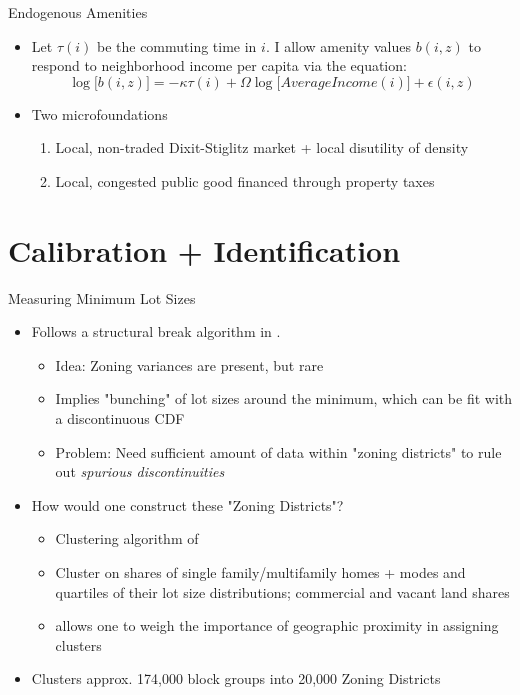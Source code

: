 \documentclass{beamer}
\begin{document}
\begin{frame}{Endogenous Amenities}
	\begin{itemize}
		\color{black}
		\itemsep1em
		\item  Let $\tau(i)$ be the commuting time in $i$. I allow amenity values $b(i, z)$ to respond to neighborhood income per capita via the equation:
		\begin{equation}
			\log\big[b(i, z)\big] = -\kappa\tau(i) + \Omega\log\bigg[AverageIncome(i)\bigg] + \epsilon(i, z)
		\end{equation} \pause
		\item Two microfoundations 
		\begin{enumerate}
			\itemsep1em
			\item Local, non-traded Dixit-Stiglitz market  \citep{Coutureetal} \citep{AlmagroDI} + local disutility of density \citep{KSC} \pause
			\item Local, congested public good financed through property taxes \citep{calabresetal} \citep{ineffTiebout}
		\end{enumerate}
	\end{itemize}
\end{frame}

\section{Calibration + Identification}

\begin{frame}{Measuring Minimum Lot Sizes}\label{returnZoningDist}
	\begin{itemize}
		\color{black}
		\itemsep1em
		\item Follows a structural break algorithm in \cite{Song}.
		\begin{itemize}
			\item Idea: Zoning variances are present, but rare 
			\item Implies "bunching" of lot sizes around the minimum, which can be fit with a discontinuous CDF  \pause 
			\item Problem: Need sufficient amount of data within "zoning districts" to rule out \textit{spurious discontinuities}
			
		\end{itemize} \pause
		
		\item How would one construct these "Zoning Districts"?
		\begin{itemize}
			\item Clustering algorithm of \cite{Chavent2018}
			\item Cluster on shares of single family/multifamily homes + modes and quartiles of their lot size distributions; commercial and vacant land shares
			\item allows one to weigh the importance of geographic proximity in assigning clusters
		\end{itemize}
	\item Clusters approx. 174,000 block groups into 20,000 Zoning Districts 	\hyperlink{zoning}{} 
	\end{itemize}
\end{frame}
\end{document}
